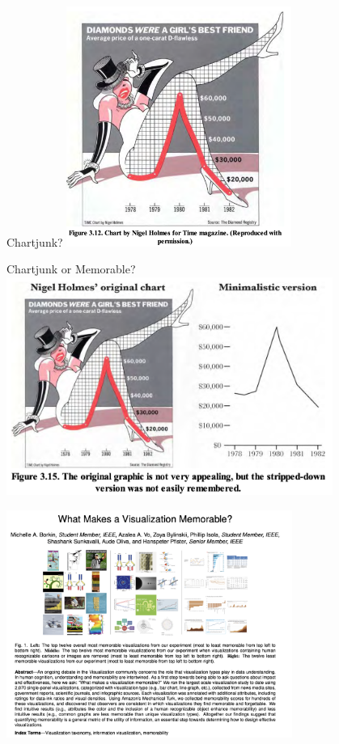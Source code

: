 \documentclass[notes, aspectratio=1610]{beamer}
\begin{document}
\begin{frame}{Chartjunk?}{}
	\centering 
	\includegraphics[width=0.55\textwidth]{images/chartjunk.png}
\end{frame}

\begin{frame}{Chartjunk or Memorable?}{}
	\centering 
	\includegraphics[width=0.8\textwidth]{images/chartjunk_vs_tufter.png}
\end{frame}

\begin{frame}{}{}
	\centering
	\includegraphics[width=0.7\textwidth]{images/memorable_data_viz.png}
\end{frame}
\end{document}
